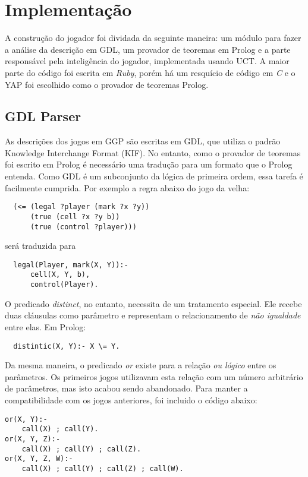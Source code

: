 \chapter{Implementação}
A construção do jogador foi dividada da seguinte maneira: um módulo para fazer a análise da descrição em GDL, um provador de teoremas em Prolog e a parte responsável pela inteligência do jogador, implementada usando UCT. A maior parte do código foi escrita em \textit{Ruby}, porém há um resquício de código em \textit{C} e o YAP foi escolhido como o provador de teoremas Prolog.

\section{GDL Parser}
As descrições dos jogos em GGP são escritas em GDL, que utiliza o padrão Knowledge Interchange Format (KIF). No entanto, como o provador de teoremas foi escrito em Prolog é necessário uma tradução para um formato que o Prolog entenda. Como GDL é um subconjunto da lógica de primeira ordem, essa tarefa é facilmente cumprida. Por exemplo a regra abaixo do jogo da velha:
\begin{verbatim}
  (<= (legal ?player (mark ?x ?y))                                                                       
      (true (cell ?x ?y b))                                                                              
      (true (control ?player)))
\end{verbatim}
será traduzida para
\begin{verbatim}
  legal(Player, mark(X, Y)):-
      cell(X, Y, b), 
      control(Player).
\end{verbatim}

O predicado \textit{distinct}, no entanto, necessita de um tratamento especial. Ele recebe duas cláusulas como parâmetro e representam o relacionamento de \textit{não igualdade} entre elas. Em Prolog:
\begin{verbatim}
  distintic(X, Y):- X \= Y. 
 \end{verbatim}

Da mesma maneira, o predicado \textit{or} existe para a relação \textit{ou lógico} entre os parâmetros. Os primeiros jogos utilizavam esta relação com um número arbitrário de parâmetros, mas isto acabou sendo abandonado. Para manter a compatibilidade com os jogos anteriores, foi incluido o código abaixo:
\begin{verbatim}
or(X, Y):- 
    call(X) ; call(Y).
or(X, Y, Z):- 
    call(X) ; call(Y) ; call(Z).
or(X, Y, Z, W):- 
    call(X) ; call(Y) ; call(Z) ; call(W).
 \end{verbatim}
 

